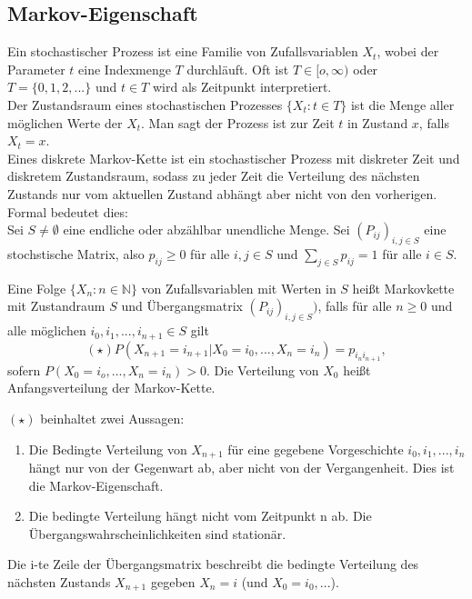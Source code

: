 \documentclass[a4paper,12pt]{article}
\begin{document}
\subsection{Markov-Eigenschaft}
Ein stochastischer Prozess ist eine Familie von Zufallsvariablen $X_t$, wobei der Parameter $t$ eine Indexmenge $T$ durchläuft.
Oft ist $T \in [o,\infty )$ oder $T= \{0,1,2, ...\}$ und $t \in T$ wird als Zeitpunkt interpretiert.\\
Der Zustandsraum eines stochastischen Prozesses $\{ X_t: t \in T   \}$ ist die Menge aller möglichen Werte der $X_t$. 
Man sagt der Prozess ist zur Zeit $t$ in Zustand $x$, falls $X_t =x$.\\
Eines diskrete Markov-Kette ist ein stochastischer Prozess mit diskreter Zeit und diskretem Zustandsraum, sodass zu jeder Zeit die Verteilung des nächsten Zustands nur vom aktuellen Zustand abhängt aber nicht von den vorherigen.
Formal bedeutet dies:\\
Sei $S \neq \emptyset  $ eine endliche oder abzählbar unendliche Menge. Sei $(P_{ij})_{i,j \in S}$ eine stochstische Matrix, also 
$p_{ij} \geq 0$ für alle $i,j \in S$ und $\sum_{j\in S}p_{ij} = 1$ für alle $i \in S$.\\

\begin{tcolorbox}[breakable, colframe=green, colback=white, title=Satz 5]
Eine Folge $\{X_n: n \in \mathbb{N}   \}$ von Zufallsvariablen mit Werten in $S$ heißt Markovkette mit Zustandraum $S$ und Übergangsmatrix $(P_{ij})_{i,j \in S})$, falls 
für alle $n \geq 0$ und alle möglichen $i_0, i_1, ..., i_{n+1} \in S$ gilt
$$
(\star) P(X_{n+1}=i_{n+1} | X_0 = i_{0}, ... , X_n = i_n) = p_{i_ni_{n+1}}
,$$
sofern $P(X_0 = i_o, ..., X_n = i_n) > 0$. Die Verteilung von $X_0$ heißt Anfangsverteilung der Markov-Kette.\\
\end{tcolorbox}

$(\star)$ beinhaltet zwei Aussagen:
\begin{enumerate}
	\item Die Bedingte Verteilung von $X_{n+1}$ für eine gegebene Vorgeschichte $i_0, i_1, ..., i_n$ hängt nur von der Gegenwart ab, aber nicht von der Vergangenheit. Dies ist die Markov-Eigenschaft.
	\item Die bedingte Verteilung hängt nicht vom Zeitpunkt n ab. Die Übergangswahrscheinlichkeiten sind stationär.
\end{enumerate}
Die i-te Zeile der Übergangsmatrix beschreibt die bedingte Verteilung des nächsten Zustands $X_{n+1}$ gegeben $X_n=i$ (und $X_0=i_0, ...$).
\end{document}
